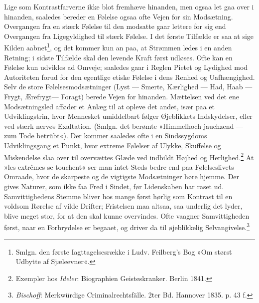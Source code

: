 \documentclass[12pt,a4paper,openany]{book}
\newcommand{\opage}[1]{\marginnote{\footnotesize\textit{[#1]}}}
\begin{document}
Lige som Kontrastfarverne ikke blot fremhæve hinanden, men ogsaa let gaa
over i hinanden, saaledes bereder en Følelse ogsaa ofte Vejen for sin
Modsætning. Overgangen fra
\opage{328}en stærk Følelse til den modsatte gaar lettere for sig end
Overgangen fra Ligegyldighed til stærk Følelse. I det første Tilfælde er
saa at sige Kilden aabnet\footnote[1]{Smlgn. den første
Iagttagelsesrække i Ludv. Feilberg’s Bog »Om størst Udbytte af
Sjæleevner«.}, og det kommer kun an paa, at Strømmen ledes i en anden
Retning; i sidste Tilfælde skal den levende Kraft først udløses. Ofte
kan en Følelse kun udvikles ad Omveje; saaledes gaar i Reglen Pietet og
Lydighed mod Autoriteten forud for den egentlige etiske Følelse i dens
Renhed og Uafhængighed. Selv de store Følelsesmodsætninger (Lyst ---
Smerte, Kærlighed --- Had, Haab --- Frygt, Ærefrygt--- Foragt) berede
Vejen for hinanden. Mættelsen ved det ene Modsætningsled afføder et
Anlæg til at opleve det andet, især paa et Udviklingstrin, hvor
Mennesket umiddelbart følger Øjeblikkets Indskydelser, eller ved stærk
nervøs Exaltation. (Smlgn. det berømte »Himmelhoch jauchzend --- zum
Tode betrübt«). Der kommer saaledes ofte i en Sindssygdoms
Udviklingsgang et Punkt, hvor extreme Følelser af Ulykke, Skuffelse og
Miskendelse slaa over til overvættes Glæde ved indbildt Højhed og
Herlighed.\footnote[2]{Exempler hos \emph{Ideler}: Biographien
Geisteskranker. Berlin 1841.} At »les extrêmes se touchent« ser man
intet Steds bedre end paa Følelseslivets Omraade, hvor de skarpeste og
de vigtigste Modsætninger høre hjemme. Der gives Naturer, som ikke faa
Fred i Sindet, før Lidenskaben har raset ud. Samvittighedens Stemme
bliver hos mange først hørlig som Kontrast til en voldsom Rørelse af
vilde Drifter; Fristelsen maa altsaa, saa underlig det lyder, blive
meget stor, for at den skal kunne overvindes. Ofte vaagner
Samvittigheden først, naar en Forbrydelse er begaaet, og driver da til
øjeblikkelig Selvangivelse.\footnote[3]{\emph{Bischoff}: Merkwürdige Criminalrechtsfälle. 2ter Bd. Hannover 1835. p. 43 f.}
\end{document}
